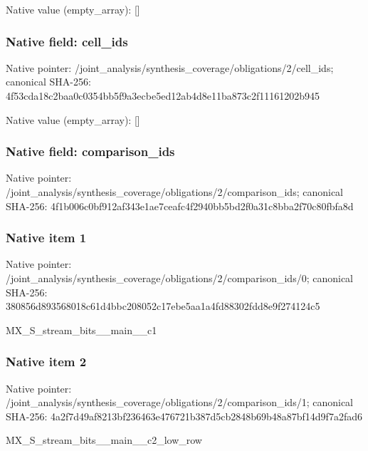 \documentclass[10pt,a4paper]{article}
\begin{document}
Native value (empty\_\allowbreak{}array): []

\subsubsection{Native field: cell\_\allowbreak{}ids}
Native pointer: /joint\_\allowbreak{}analysis/synthesis\_\allowbreak{}coverage/obligations/2/cell\_\allowbreak{}ids; canonical SHA-256: 4f53cda18c2baa0c0354bb5f9a3ecbe5ed12ab4d8e11ba873c2f11161202b945

Native value (empty\_\allowbreak{}array): []

\subsubsection{Native field: comparison\_\allowbreak{}ids}
Native pointer: /joint\_\allowbreak{}analysis/synthesis\_\allowbreak{}coverage/obligations/2/comparison\_\allowbreak{}ids; canonical SHA-256: 4f1b006c0bf912af343e1ae7ceafc4f2940bb5bd2f0a31c8bba2f70c80fbfa8d

\subsubsection{Native item 1}
Native pointer: /joint\_\allowbreak{}analysis/synthesis\_\allowbreak{}coverage/obligations/2/comparison\_\allowbreak{}ids/0; canonical SHA-256: 380856d893568018c61d4bbc208052c17ebe5aa1a4fd88302fdd8e9f274124c5

\begingroup\raggedright\sloppy MX\_\allowbreak{}S\_\allowbreak{}stream\_\allowbreak{}bits\_\allowbreak{}\_\allowbreak{}main\_\allowbreak{}\_\allowbreak{}c1\par\endgroup

\subsubsection{Native item 2}
Native pointer: /joint\_\allowbreak{}analysis/synthesis\_\allowbreak{}coverage/obligations/2/comparison\_\allowbreak{}ids/1; canonical SHA-256: 4a2f7d49af8213bf236463e476721b387d5cb2848b69b48a87bf14d9f7a2fad6

\begingroup\raggedright\sloppy MX\_\allowbreak{}S\_\allowbreak{}stream\_\allowbreak{}bits\_\allowbreak{}\_\allowbreak{}main\_\allowbreak{}\_\allowbreak{}c2\_\allowbreak{}low\_\allowbreak{}row\par\endgroup
\end{document}
